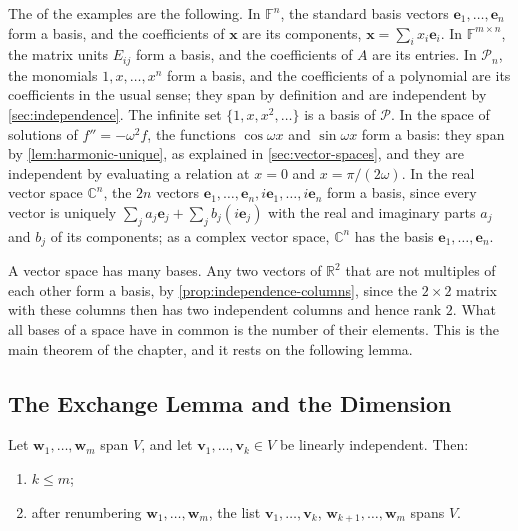 The  of the examples are the following. In $\mathbb F^n$, the standard basis vectors $\mathbf e_1,\ldots,\mathbf e_n$ form a basis, and the coefficients of $\mathbf x$ are its components, $\mathbf x=\sum_ix_i\mathbf e_i$. In $\mathbb F^{m\times n}$, the matrix units $E_{ij}$ form a basis, and the coefficients of $A$ are its entries. In $\mathcal P_n$, the monomials $1,x,\ldots,x^n$ form a basis, and the coefficients of a polynomial are its coefficients in the usual sense; they span by definition and are independent by \cref{sec:independence}. The infinite set $\{1,x,x^2,\ldots\}$ is a basis of $\mathcal P$. In the space of solutions of $f''=-\omega^2f$, the functions $\cos\omega x$ and $\sin\omega x$ form a basis: they span by \cref{lem:harmonic-unique}, as explained in \cref{sec:vector-spaces}, and they are independent by evaluating a relation at $x=0$ and $x=\pi/(2\omega)$. In the real vector space $\mathbb C^n$, the $2n$ vectors $\mathbf e_1,\ldots,\mathbf e_n,i\mathbf e_1,\ldots,i\mathbf e_n$ form a basis, since every vector is uniquely $\sum_ja_j\mathbf e_j+\sum_jb_j(i\mathbf e_j)$ with the real and imaginary parts $a_j$ and $b_j$ of its components; as a complex vector space, $\mathbb C^n$ has the basis $\mathbf e_1,\ldots,\mathbf e_n$.

A vector space has many bases. Any two vectors of $\mathbb R^2$ that are not multiples of each other form a basis, by \cref{prop:independence-columns}, since the $2\times2$ matrix with these columns then has two independent columns and hence rank $2$. What all bases of a space have in common is the number of their elements. This is the main theorem of the chapter, and it rests on the following lemma.

\subsection{The Exchange Lemma and the Dimension}

\begin{lemma}
\label{lem:steinitz}
Let $\mathbf w_1,\ldots,\mathbf w_m$ span $V$, and let $\mathbf v_1,\ldots,\mathbf v_k\in V$ be linearly independent. Then:
\begin{enumerate}
\item $k\le m$;
\item after renumbering $\mathbf w_1,\ldots,\mathbf w_m$, the list $\mathbf v_1,\ldots,\mathbf v_k$, $\mathbf w_{k+1},\ldots,\mathbf w_m$ spans $V$.
\end{enumerate}
\end{lemma}

